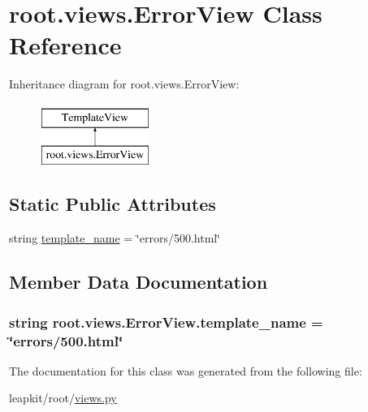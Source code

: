 \hypertarget{classroot_1_1views_1_1_error_view}{\section{root.\-views.\-Error\-View Class Reference}
\label{classroot_1_1views_1_1_error_view}
}
Inheritance diagram for root.\-views.\-Error\-View\-:\begin{figure}[H]
\begin{center}
\leavevmode
\includegraphics[height=2.000000cm]{classroot_1_1views_1_1_error_view}
\end{center}
\end{figure}
\subsection*{Static Public Attributes}
\begin{DoxyCompactItemize}
\item 
string \hyperlink{classroot_1_1views_1_1_error_view_afcf21d951df448a97b80f7f34fc26803}{template\-\_\-name} = \char`\"{}errors/500.html\char`\"{}
\end{DoxyCompactItemize}


\subsection{Member Data Documentation}
\hypertarget{classroot_1_1views_1_1_error_view_afcf21d951df448a97b80f7f34fc26803}{
\subsubsection[{template\-\_\-name}]{\setlength{\rightskip}{0pt plus 5cm}string root.\-views.\-Error\-View.\-template\-\_\-name = \char`\"{}errors/500.html\char`\"{}\hspace{0.3cm}{\ttfamily [static]}}}\label{classroot_1_1views_1_1_error_view_afcf21d951df448a97b80f7f34fc26803}


The documentation for this class was generated from the following file\-:\begin{DoxyCompactItemize}
\item 
leapkit/root/\hyperlink{root_2views_8py}{views.\-py}\end{DoxyCompactItemize}
